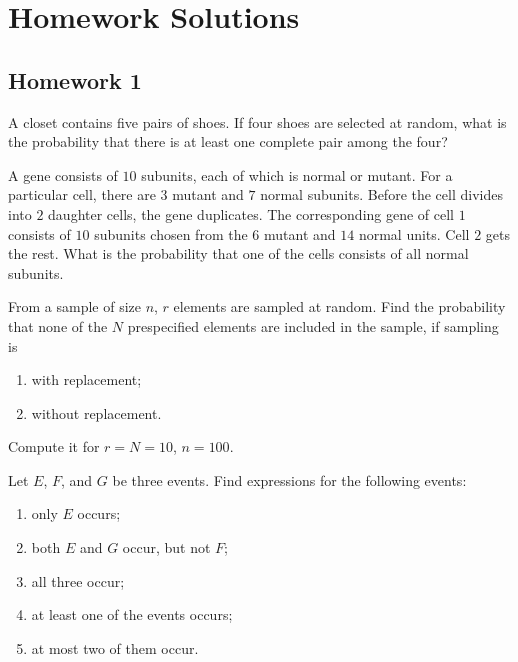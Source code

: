 \section{Homework Solutions}
\subsection{Homework 1}
\begin{problem}[Handout 1, \# 5]
  A closet contains five pairs of shoes. If four shoes are selected at
  random, what is the probability that there is at least one complete pair
  among the four?
\end{problem}
\begin{solution}
\end{solution}

\begin{problem}[Handout 1, \# 7]
  A gene consists of \(10\) subunits, each of which is normal or
  mutant. For a particular cell, there are \(3\) mutant and \(7\) normal
  subunits. Before the cell divides into \(2\) daughter cells, the gene
  duplicates. The corresponding gene of cell \(1\) consists of \(10\)
  subunits chosen from the \(6\) mutant and \(14\) normal units. Cell \(2\)
  gets the rest. What is the probability that one of the cells consists of
  all normal subunits.
\end{problem}
\begin{solution}
\end{solution}

\begin{problem}[Handout 1, \# 9]
  From a sample of size \(n\), \(r\) elements are sampled at random. Find
  the probability that none of the \(N\) prespecified elements are included
  in the sample, if sampling is
  \begin{enumerate}[label=(\alph*)]
  \item with replacement;
  \item without replacement.
  \end{enumerate}
  Compute it for \(r=N=10\), \(n=100\).
\end{problem}
\begin{solution}
\end{solution}

\begin{problem}[Handout 1, \# 11]
  Let \(E\), \(F\), and \(G\) be three events. Find expressions for the
  following events:
  \begin{enumerate}[label=(\alph*),noitemsep]
  \item only \(E\) occurs;
  \item both \(E\) and \(G\) occur, but not \(F\);
  \item all three occur;
  \item at least one of the events occurs;
  \item at most two of them occur.
  \end{enumerate}
\end{problem}
\begin{solution}
\end{solution}
\newpage

